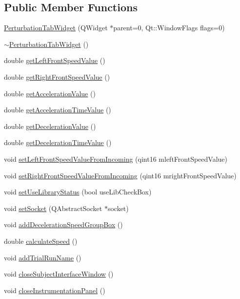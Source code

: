 \subsection*{Public Member Functions}
\begin{DoxyCompactItemize}
\item 
\hyperlink{class_perturbation_tab_widget_a7a398b91c41f2f94b880909da745f29a}{Perturbation\+Tab\+Widget} (Q\+Widget $\ast$parent=0, Qt\+::\+Window\+Flags flags=0)
\item 
\hyperlink{class_perturbation_tab_widget_a8c2ec5ad166d2a5bac3f383210b24fbf}{$\sim$\+Perturbation\+Tab\+Widget} ()
\item 
double \hyperlink{class_perturbation_tab_widget_a1c595f54d7528bd69f949849b3cb9312}{get\+Left\+Front\+Speed\+Value} ()
\item 
double \hyperlink{class_perturbation_tab_widget_a11a37b5600c3003608515a8be459128c}{get\+Right\+Front\+Speed\+Value} ()
\item 
double \hyperlink{class_perturbation_tab_widget_a2c1a491c8fc908d030f763d675e31d70}{get\+Acceleration\+Value} ()
\item 
double \hyperlink{class_perturbation_tab_widget_a69d99f18f946cd72a3e1963cbc5196f9}{get\+Acceleration\+Time\+Value} ()
\item 
double \hyperlink{class_perturbation_tab_widget_a4f4d6f185008895f009dd49163225604}{get\+Deceleration\+Value} ()
\item 
double \hyperlink{class_perturbation_tab_widget_aa367d865074bb173bc3b9599eb11e10e}{get\+Deceleration\+Time\+Value} ()
\item 
void \hyperlink{class_perturbation_tab_widget_ad623552392a607d427df1e76c3b0d110}{set\+Left\+Front\+Speed\+Value\+From\+Incoming} (qint16 mleft\+Front\+Speed\+Value)
\item 
void \hyperlink{class_perturbation_tab_widget_a8f35140d106abf45d144a1fc6b08f423}{set\+Right\+Front\+Speed\+Value\+From\+Incoming} (qint16 mright\+Front\+Speed\+Value)
\item 
void \hyperlink{class_perturbation_tab_widget_af54ddc95a7f3738b9083ff9ca5934d22}{set\+Use\+Library\+Status} (bool use\+Lib\+Check\+Box)
\item 
void \hyperlink{class_perturbation_tab_widget_a61e4292beb7e59e386bf73a724b2b308}{set\+Socket} (Q\+Abstract\+Socket $\ast$socket)
\item 
void \hyperlink{class_perturbation_tab_widget_ad9a685f191ca94bdc47f148273fdf1f4}{add\+Deceleration\+Speed\+Group\+Box} ()
\item 
double \hyperlink{class_perturbation_tab_widget_aa79aeeb2da8075a4cd6ac6c08e0fb135}{calculate\+Speed} ()
\item 
void \hyperlink{class_perturbation_tab_widget_a237937a4a9bd3724fe615d0b5a7b5638}{add\+Trial\+Run\+Name} ()
\item 
void \hyperlink{class_perturbation_tab_widget_a133aa07dacbf905b3f8575cae27c1c4b}{close\+Subject\+Interface\+Window} ()
\item 
void \hyperlink{class_perturbation_tab_widget_a9484f325434396eee32d49cacd8ed357}{close\+Instrumentation\+Panel} ()
\end{DoxyCompactItemize}
